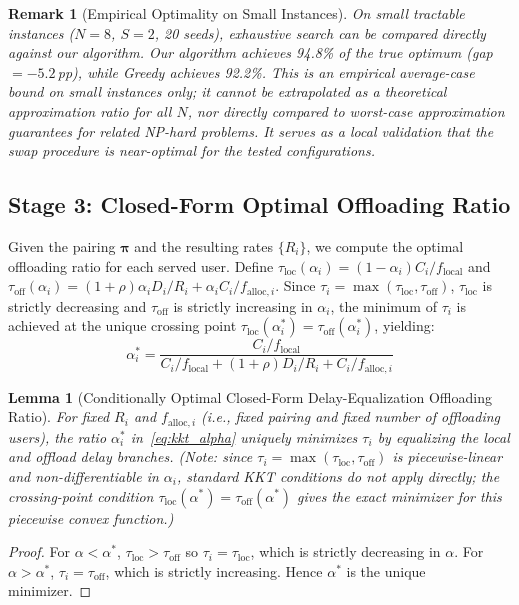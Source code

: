 \documentclass[journal]{IEEEtran}
\newtheorem{lemma}{Lemma}
\newtheorem{remark}{Remark}
\begin{document}
\begin{remark}[Empirical Optimality on Small Instances]\label{rem:empirical}
On small tractable instances ($N\!=\!8$, $S\!=\!2$, 20 seeds), exhaustive search can be compared directly against our algorithm.
Our algorithm achieves 94.8\% of the true optimum (gap $= -5.2$\,pp), while Greedy achieves 92.2\%.
This is an empirical average-case bound on small instances only; it cannot be extrapolated as a theoretical approximation ratio for all $N$, nor directly compared to worst-case approximation guarantees for related NP-hard problems.
It serves as a local validation that the swap procedure is near-optimal for the tested configurations.
\end{remark}

\subsection{Stage 3: Closed-Form Optimal Offloading Ratio}

Given the pairing $\boldsymbol{\pi}$ and the resulting rates $\{R_i\}$, we compute the optimal offloading ratio for each served user.
Define $\tau_{\text{loc}}(\alpha_i) = (1 - \alpha_i) C_i / f_{\text{local}}$ and $\tau_{\text{off}}(\alpha_i) = (1+\rho)\alpha_i D_i / R_i + \alpha_i C_i / f_{\text{alloc},i}$.
Since $\tau_i = \max(\tau_{\text{loc}}, \tau_{\text{off}})$, $\tau_{\text{loc}}$ is strictly decreasing and $\tau_{\text{off}}$ is strictly increasing in $\alpha_i$, the minimum of $\tau_i$ is achieved at the unique crossing point $\tau_{\text{loc}}(\alpha_i^*) = \tau_{\text{off}}(\alpha_i^*)$, yielding:
\begin{equation}
    \alpha_i^* = \frac{C_i / f_{\text{local}}}{C_i / f_{\text{local}} + (1+\rho) D_i / R_i + C_i / f_{\text{alloc},i}}
    \label{eq:kkt_alpha}
\end{equation}

\begin{lemma}[Conditionally Optimal Closed-Form Delay-Equalization Offloading Ratio]
\label{lem:kkt}
For fixed $R_i$ and $f_{\text{alloc},i}$ (i.e., fixed pairing and fixed number of offloading users), the ratio $\alpha_i^*$ in~\eqref{eq:kkt_alpha} uniquely minimizes $\tau_i$ by equalizing the local and offload delay branches.
\emph{(Note: since $\tau_i = \max(\tau_{\text{loc}}, \tau_{\text{off}})$ is piecewise-linear and non-differentiable in $\alpha_i$, standard KKT conditions do not apply directly; the crossing-point condition $\tau_{\text{loc}}(\alpha^*) = \tau_{\text{off}}(\alpha^*)$ gives the exact minimizer for this piecewise convex function.)}
\end{lemma}
\begin{proof}
For $\alpha < \alpha^*$, $\tau_{\text{loc}} > \tau_{\text{off}}$ so $\tau_i = \tau_{\text{loc}}$, which is strictly decreasing in $\alpha$. For $\alpha > \alpha^*$, $\tau_i = \tau_{\text{off}}$, which is strictly increasing. Hence $\alpha^*$ is the unique minimizer.
\end{proof}
\end{document}
